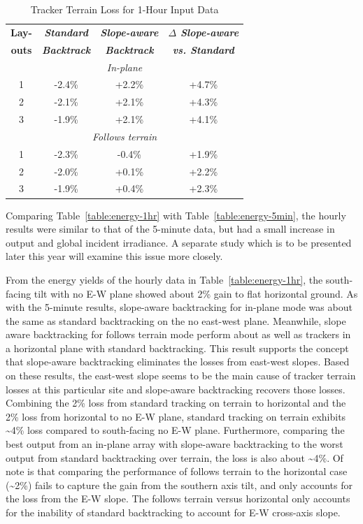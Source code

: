 \documentclass[conference]{IEEEtran}
\begin{document}
\begin{table}[htbp]
\caption{Tracker Terrain Loss for 1-Hour Input Data}
\begin{center}
\begin{tabular}{|c|c|c|c|}
\hline
\textbf{Lay-}& \textbf{\textit{Standard}}& \textbf{\textit{Slope-aware}}& \textbf{\textit{$\Delta$ Slope-aware}} \\
\textbf{outs}& \textbf{\textit{Backtrack}}&    \textbf{\textit{Backtrack}}& \textbf{\textit{vs. Standard}} \\
\hline
\multicolumn{4}{|c|}{\textit{In-plane}} \\
\hline
1& -2.4\% & +2.2\% &  +4.7\% \\
\hline
2& -2.1\% & +2.1\% &  +4.3\% \\
\hline
3& -1.9\% & +2.1\% &  +4.1\% \\
\hline
\multicolumn{4}{|c|}{\textit{Follows terrain}} \\
\hline
1& -2.3\% & -0.4\% &  +1.9\% \\
\hline
2& -2.0\% & +0.1\% &  +2.2\% \\
\hline
3& -1.9\% & +0.4\% &  +2.3\% \\
\hline
\end{tabular}
\label{table:terrain-loss-1hr}
\end{center}
\end{table}

Comparing Table~\ref{table:energy-1hr} with Table~\ref{table:energy-5min}, the hourly results were similar to that of the 5-minute data, but had a small increase in output and global incident irradiance. A separate study which is to be presented later this year will examine this issue more closely. 

From the energy yields of the hourly data in Table~\ref{table:energy-1hr}, the south-facing tilt with no E-W plane showed about 2\% gain to flat horizontal ground. As with the 5-minute results, slope-aware backtracking for in-plane mode was about the same as standard backtracking on the no east-west plane. Meanwhile, slope aware backtracking for follows terrain mode perform about as well as trackers in a horizontal plane with standard backtracking. This result supports the concept that slope-aware backtracking eliminates the losses from east-west slopes. Based on these results, the east-west slope seems to be the main cause of tracker terrain losses at this particular site and slope-aware backtracking recovers those losses.
Combining the 2\% loss from standard tracking on terrain to horizontal and the 2\% loss from horizontal to no E-W plane, standard tracking on terrain exhibits \textasciitilde 4\% loss compared to south-facing no E-W plane. Furthermore, comparing the best output from an in-plane array with slope-aware backtracking to the worst output from standard backtracking over terrain, the loss is also about \textasciitilde 4\%. Of note is that comparing the performance of follows terrain to the horizontal case (\textasciitilde 2\%) fails to capture the gain from the southern axis tilt, and only accounts for the loss from the E-W slope. The follows terrain versus horizontal only accounts for the inability of standard backtracking to account for E-W cross-axis slope.
\end{document}
